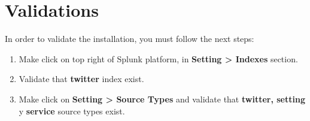 \documentclass[report]{article}
\begin{document}
\section{Validations}

In order to validate the installation, you must follow the next steps:
\newline

\begin{enumerate}[label=(\alph*)]
\item Make click on top right of Splunk platform, in \textbf{Setting > Indexes} section.
\item Validate that \textbf{twitter} index exist.
\item Make click on \textbf{Setting > Source Types} and validate that \textbf{twitter, setting} y \textbf{service} source types exist.
\newline
\end{enumerate}
\end{document}
